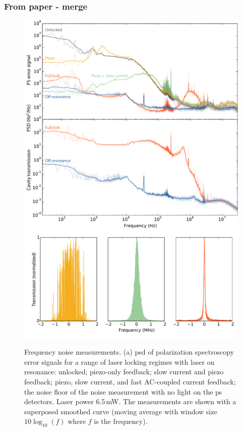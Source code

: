 \subsubsection{From paper - merge}
\begin{figure}[htbp]
\centering
    \includegraphics[width=0.9\linewidth]{chapter1/Figs/fig4a_v3.pdf}
    \label{fig:PSDs}
    \includegraphics[width=0.9\linewidth]{chapter1/Figs/fig4b_v1.pdf}
    \label{fig:cavity_scans}
\caption{Frequency noise measurements. (a) \Gls*{psd} of polarization spectroscopy error signals for a range of laser locking regimes with laser on resonance: unlocked; piezo-only feedback; slow current and piezo feedback; piezo, slow current, and fast AC-coupled current feedback; the noise floor of the noise measurement with no light on the \gls*{ps} detectors. Laser power 6.5\,mW.
The measurements are shown with a superposed smoothed curve (moving average  with window size $10\log_{10}(f)$ where $f$ is the frequency).
}
\end{figure}
